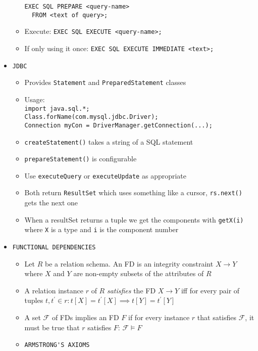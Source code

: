 \documentclass[landscape,8pt]{extarticle}
\newcommand{\code}{\lstinline}
\begin{document}
\begin{multicols}{4}
\begin{itemize}
\begin{itemize}
\code{EXEC SQL PREPARE <query-name>}\\
\code{  FROM <text of query>;}
        \item Execute: \code{EXEC SQL EXECUTE <query-name>;}
        \item If only using it once:
\code{EXEC SQL EXECUTE IMMEDIATE <text>;}
        \end{itemize}
        \item \code{JDBC}
    \begin{itemize}
        \item Provides \code{Statement} and \code{PreparedStatement} classes
        \item Usage:\\
\code{import java.sql.*;}\\
\code{Class.forName(com.mysql.jdbc.Driver);}\\
\code{Connection myCon = DriverManager.getConnection(...);}
        \item \code{createStatement()} takes a string of a SQL statement
        \item \code{prepareStatement()} is configurable
        \item Use \code{executeQuery} or \code{executeUpdate} as appropriate
        \item Both return \code{ResultSet} which uses something like a cursor, \code{rs.next()} gets
        the next one
        \item When a resultSet returns a tuple we get the components with \code{getX(i)} where
        \code{X} is a type and \code{i} is the component number
    \end{itemize}
    \item \code{FUNCTIONAL DEPENDENCIES}
    \begin{itemize}
        \item Let $R$ be a relation schema. An FD is an integrity constraint $X \rightarrow Y$ where
        $X$ and $Y$ are non-empty subsets of the attributes of $R$
        \item A relation instance $r$ of $R$ \emph{satisfies} the FD $X \rightarrow Y$ iff for every
        pair of tuples $t, t^\prime \in r: t[X] = t^\prime[X] \implies t[Y] = t^\prime[Y]$
        \item A set $\mathcal{F}$ of FDs implies an FD $F$ if for every instance $r$ that satisfies
        $\mathcal{F}$, it must be true that $r$ satisfies $F$: $\mathcal{F} \models F$
        \item \code{ARMSTRONG'S AXIOMS}
        \begin{itemize}

\end{itemize}
\end{itemize}
\end{itemize}
\end{multicols}
\end{document}
